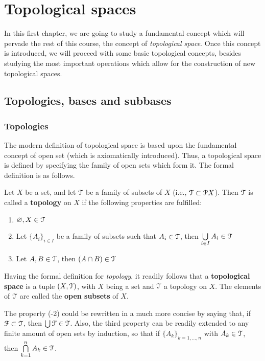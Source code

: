 \chapter{Topological spaces}

In this first chapter, we are going to study a fundamental concept which will pervade the rest of this course, the concept of \emph{topological space}. Once this concept is introduced, we will proceed with some basic topological concepts, besides studying the most important operations which allow for the construction of new topological spaces.

\section{Topologies, bases and subbases}

\subsection{Topologies}
The modern definition of topological space is based upon the fundamental concept of open set (which is axiomatically introduced). Thus, a topological space is defined by specifying the family of open sets which form it.  The formal definition is as follows.

\begin{definition}
Let $X$ be a set, and let $\EuScript{T}$ be a family of subsets of $X$ (i.e., $\EuScript{T}\subset\EuScript{P} X$). Then $\EuScript{T}$ is called a \textbf{topology} on $X$ if the following properties are fulfilled:
\begin{enumerate}
	\item $\varnothing, X\in \EuScript{T}$
	\item Let $\{A_i\}_{i\in I}$ be a family of subsets such that $A_i \in \EuScript{T}$, then $\bigcup\limits_{i\in I} A_i\in\EuScript{T}$
	\item Let $A, B\in \EuScript{T}$, then $(A\cap B)\in \EuScript{T}$
\end{enumerate}
\label{def:topology}
\end{definition}

Having the formal definition for \emph{topology}, it readily follows that a \textbf{topological space} is a tuple $(X, \EuScript{T})$, with $X$ being a set and $\EuScript{T}$ a topology on $X$. The elements of $\EuScript{T}$ are called the \textbf{open subsets} of $X$. 

\begin{remark}
The property (-2) could be rewritten in a much more concise by saying that, if $\EuScript{F}\subset\EuScript{T}$, then $\bigcup\EuScript{F}\in\EuScript{T}$.
Also, the third property can be readily extended to any finite amount of open sets by induction, so that if $\{A_k\}_{k=1,\dots,n}$ with $A_k\in\EuScript{T}$, then $\bigcap\limits_{k=1}^nA_k\in \EuScript{T}$.
\end{remark}

